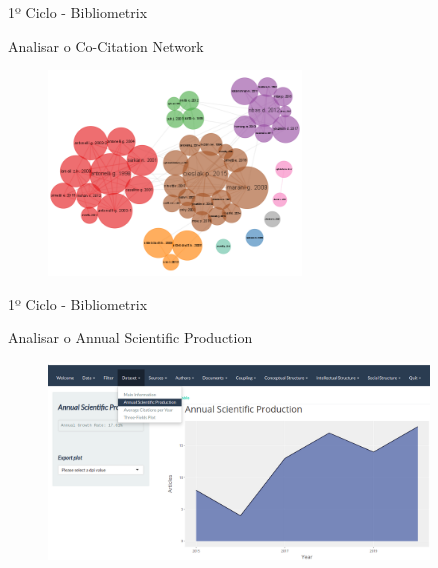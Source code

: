 \begin{frame}{1º Ciclo - Bibliometrix}

	Analisar o Co-Citation Network
	
	\begin{figure}[hb]
		\centering
		\includegraphics[width=0.6\textwidth]{figures/bibliometrix/brede1.png}
	\end{figure}
	
\end{frame}

\begin{frame}{1º Ciclo - Bibliometrix}

	Analisar o Annual Scientific Production
	
	\begin{figure}[hb]
		\centering
		\includegraphics[width=0.9\textwidth]{figures/bibliometrix/b10.png}
	\end{figure}
	
\end{frame}


